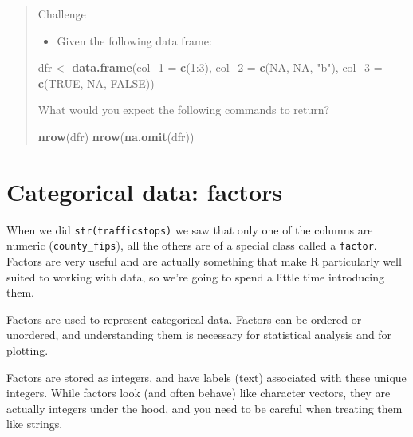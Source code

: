 \documentclass[]{book}
\newenvironment{Shaded}{\begin{snugshade}}{\end{snugshade}}
\newcommand{\KeywordTok}[1]{\textcolor[rgb]{0.13,0.29,0.53}{\textbf{{#1}}}}
\newcommand{\DataTypeTok}[1]{\textcolor[rgb]{0.13,0.29,0.53}{{#1}}}
\newcommand{\DecValTok}[1]{\textcolor[rgb]{0.00,0.00,0.81}{{#1}}}
\newcommand{\StringTok}[1]{\textcolor[rgb]{0.31,0.60,0.02}{{#1}}}
\newcommand{\OtherTok}[1]{\textcolor[rgb]{0.56,0.35,0.01}{{#1}}}
\newcommand{\NormalTok}[1]{{#1}}
\providecommand{\tightlist}{%
  \setlength{\itemsep}{0pt}\setlength{\parskip}{0pt}}
\theoremstyle{definition}
\theoremstyle{definition}
\theoremstyle{remark}
\begin{document}
\begin{quote}
Challenge

\begin{itemize}
\tightlist
\item
  Given the following data frame:
\end{itemize}

\begin{Shaded}
\begin{Highlighting}[]
\NormalTok{dfr <-}\StringTok{ }\KeywordTok{data.frame}\NormalTok{(}\DataTypeTok{col_1 =} \KeywordTok{c}\NormalTok{(}\DecValTok{1}\NormalTok{:}\DecValTok{3}\NormalTok{), }
                  \DataTypeTok{col_2 =} \KeywordTok{c}\NormalTok{(}\OtherTok{NA}\NormalTok{, }\OtherTok{NA}\NormalTok{, }\StringTok{"b"}\NormalTok{), }
                  \DataTypeTok{col_3 =} \KeywordTok{c}\NormalTok{(}\OtherTok{TRUE}\NormalTok{, }\OtherTok{NA}\NormalTok{, }\OtherTok{FALSE}\NormalTok{))}
\end{Highlighting}
\end{Shaded}

What would you expect the following commands to return?

\begin{Shaded}
\begin{Highlighting}[]
\KeywordTok{nrow}\NormalTok{(dfr)}
\KeywordTok{nrow}\NormalTok{(}\KeywordTok{na.omit}\NormalTok{(dfr))}
\end{Highlighting}
\end{Shaded}
\end{quote}

\section{Categorical data: factors}\label{categorical-data-factors}

When we did \texttt{str(trafficstops)} we saw that only one of the
columns are numeric (\texttt{county\_fips}), all the others are of a
special class called a \texttt{factor}. Factors are very useful and are
actually something that make R particularly well suited to working with
data, so we're going to spend a little time introducing them.

Factors are used to represent categorical data. Factors can be ordered
or unordered, and understanding them is necessary for statistical
analysis and for plotting.

Factors are stored as integers, and have labels (text) associated with
these unique integers. While factors look (and often behave) like
character vectors, they are actually integers under the hood, and you
need to be careful when treating them like strings.
\end{document}
